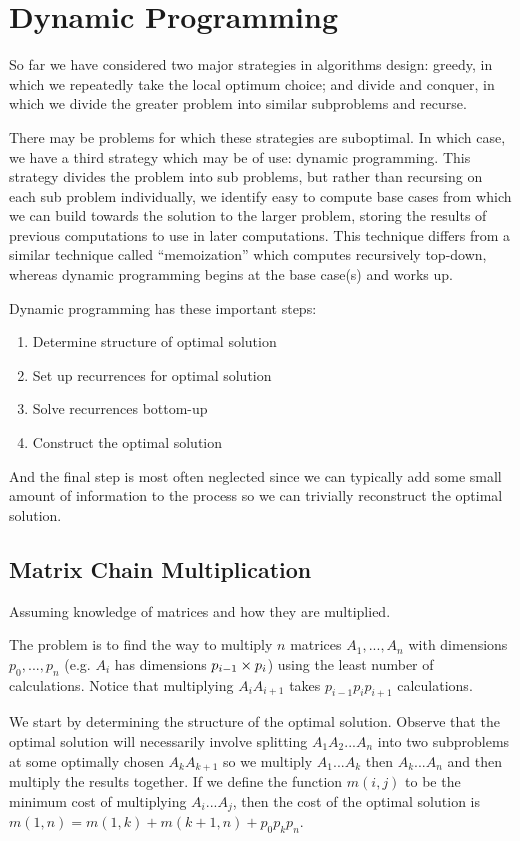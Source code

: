 \chapter{Dynamic Programming}

So far we have considered two major strategies in algorithms design:
greedy, in which we repeatedly take the local optimum choice; and
divide and conquer, in which we divide the greater problem into
similar subproblems and recurse.

There may be problems for which these strategies are suboptimal.  In
which case, we have a third strategy which may be of use: dynamic
programming.  This strategy divides the problem into sub problems, but
rather than recursing on each sub problem individually, we identify
easy to compute base cases from which we can build towards the
solution to the larger problem, storing the results of previous
computations to use in later computations.  This technique differs
from a similar technique called ``memoization'' which computes
recursively top-down, whereas dynamic programming begins at the base
case(s) and works up.

Dynamic programming has these important steps:

\begin{enumerate}
\item Determine structure of optimal solution
\item Set up recurrences for optimal solution
\item Solve recurrences bottom-up
\item Construct the optimal solution
\end{enumerate}

And the final step is most often neglected since we can typically add
some small amount of information to the process so we can trivially
reconstruct the optimal solution.

\section{Matrix Chain Multiplication}

Assuming knowledge of matrices and how they are multiplied.

The problem is to find the way to multiply $n$ matrices $A_1,...,A_n$
with dimensions $p_0,...,p_n$ (e.g. $A_i$ has dimensions $p_{i-1}
\times p_i$) using the least number of calculations.  Notice that
multiplying $A_iA_{i+1}$ takes $p_{i-1}p_ip_{i+1}$ calculations.

We start by determining the structure of the optimal solution.
Observe that the optimal solution will necessarily involve splitting
$A_1A_2...A_n$ into two subproblems at some optimally chosen
$A_kA_{k+1}$ so we multiply $A_1...A_k$ then $A_k...A_n$ and then
multiply the results together.  If we define the function $m(i,j)$ to
be the minimum cost of multiplying $A_i...A_j$, then the cost of the
optimal solution is $m(1,n) = m(1,k) + m(k+1,n) + p_0p_kp_n$.


